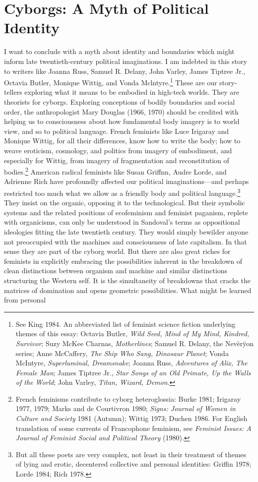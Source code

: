 \documentclass[DIV=12,%
               BCOR=10mm,%
               headinclude=false,%
               footinclude=false,open=any,%
               fontsize=11pt,%
               twoside,%
               paper=210mm:11in]%
               {scrbook}
\begin{document}
\chapter{Cyborgs: A Myth of Political Identity}


I want to conclude with a myth about identity and boundaries which might inform late twentieth-century political imaginations. I am indebted in this story to writers like Joanna Russ, Samuel R. Delany, John Varley, James Tiptree Jr., Octavia Butler, Monique Wittig, and Vonda Mclntyre.\footnote{See King 1984. An abbreviated list of feminist science fiction underlying themes of this essay: Octavia Butler, \emph{Wild Seed, Mind of My Mind, Kindred, Survivor}; Suzy McKee Charnas, \emph{Motherlines}; Samuel R. Delany, the Nevèrÿon series; Anne McCaffery, \emph{The Ship Who Sang, Dinosaur Planet}; Vonda McIntyre, \emph{Superluminal, Dreamsnake}; Joanna Russ, \emph{Adventures of Alix, The Female Man}; James Tiptree Jr., \emph{Star Songs of an Old Primate, Up the Walls of the World}; John Varley, \emph{Titan, Wizard, Demon}.} These are our story-tellers exploring what it means to be embodied in high-tech worlds. They are theorists for cyborgs. Exploring conceptions of bodily boundaries and social order, the anthropologist Mary Douglas (1966, 1970) should be credited with helping us to consciousness about how fundamental body imagery is to world view, and so to political language. French feminists like Luce Irigaray and Monique Wittig, for all their differences, know how to write the body; how to weave eroticism, cosmology, and politics from imagery of embodiment, and especially for Wittig, from imagery of fragmentation and reconstitution of bodies.\footnote{French feminisms contribute to cyborg heteroglossia: Burke 1981; Irigaray 1977, 1979; Marks and de Courtivron 1980; \emph{Signs: Journal of Women in Culture and Society} 1981 (Autumn); Wittig 1973; Duchen 1986. For English translation of some currents of Francophone feminism, see \emph{Feminist Issues: A Journal of Feminist Social and Political Theory} (1980).} American radical feminists like Susan Griffnn, Audre Lorde, and Adrienne Rich have profoundly affected our political imaginations—and perhaps restricted too much what we allow as a friendly body and political language.\footnote{But all these poets are very complex, not least in their treatment of themes of lying and erotic, decentered collective and personal identities: Griffin 1978; Lorde 1984; Rich 1978.} They insist on the organic, opposing it to the technological. But their symbolic systems and the related positions of ecofeminism and feminist paganism, replete with organicisms, can only be understood in Sandoval’s terms as oppositional ideologies fitting the late twentieth century. They would simply bewilder anyone not preoccupied with the machines and consciousness of late capitalism. In that sense they are part of the cyborg world. But there are also great riches for feminists in explicitly embracing the possibilities inherent in the breakdown of clean distinctions between organism and machine and similar distinctions structuring the Western self. It is the simultaneity of breakdowns that cracks the matrices of domination and opens geometric possibilities. What might be learned from personal 
\end{document}
